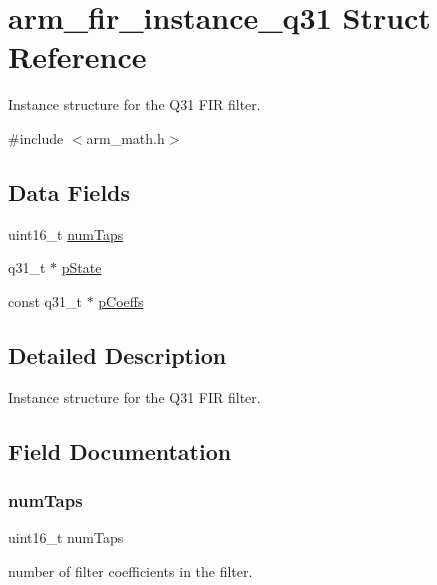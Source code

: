 \hypertarget{structarm__fir__instance__q31}{}\section{arm\+\_\+fir\+\_\+instance\+\_\+q31 Struct Reference}
\label{structarm__fir__instance__q31}


Instance structure for the Q31 F\+IR filter.  




{\ttfamily \#include $<$arm\+\_\+math.\+h$>$}

\subsection*{Data Fields}
\begin{DoxyCompactItemize}
\item 
uint16\+\_\+t \mbox{\hyperlink{structarm__fir__instance__q31_a751941891e47f522a7f5375fe8990aac}{num\+Taps}}
\item 
q31\+\_\+t $\ast$ \mbox{\hyperlink{structarm__fir__instance__q31_adee4ba3ee8869865af7d8fa08ca913d6}{p\+State}}
\item 
const q31\+\_\+t $\ast$ \mbox{\hyperlink{structarm__fir__instance__q31_a80e7fdf4747dbda8eadb2663fb4be317}{p\+Coeffs}}
\end{DoxyCompactItemize}


\subsection{Detailed Description}
Instance structure for the Q31 F\+IR filter. 

\subsection{Field Documentation}
\mbox{\label{structarm__fir__instance__q31_a751941891e47f522a7f5375fe8990aac}} 
\subsubsection{\texorpdfstring{numTaps}{numTaps}}
{\footnotesize\ttfamily uint16\+\_\+t num\+Taps}

number of filter coefficients in the filter. \mbox{\label{structarm__fir__instance__q31_a80e7fdf4747dbda8eadb2663fb4be317}} 

